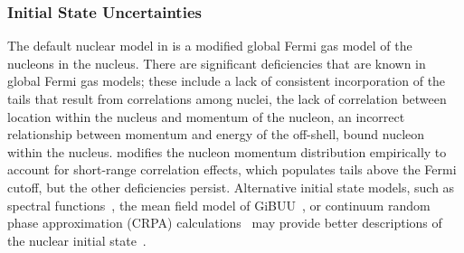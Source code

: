 \subsubsection{Initial State Uncertainties}
The default nuclear model in  is a modified global Fermi gas model of the nucleons in the nucleus.  There are significant deficiencies that are known in global Fermi gas models; these include a lack of consistent incorporation of the tails that result from correlations among nuclei, the lack of correlation between location within the nucleus and momentum of the nucleon, an incorrect relationship between momentum and energy of the off-shell, bound nucleon within the nucleus.  modifies the nucleon momentum distribution empirically to account for short-range correlation effects, which populates tails above the Fermi cutoff, but the other deficiencies persist. Alternative initial state models, such as spectral functions~\cite{Benhar:1994hw,Nieves:2004wx}, the mean field model of GiBUU~\cite{Gallmeister:2016dnq}, or continuum random phase approximation (CRPA) calculations~\cite{Pandey:2014tza} may provide better descriptions of the nuclear initial state~\cite{Sobczyk:2017mts}. %





